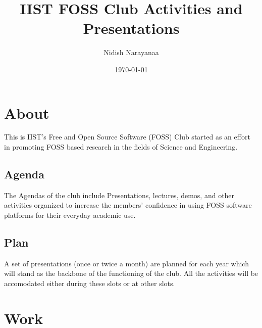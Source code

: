 \documentclass[11pt]{article}
\author{Nidish Narayanaa}
\date{\today}
\title{IIST FOSS Club Activities and Presentations}
\begin{document}
\maketitle
\tableofcontents


\section{About}
\label{sec-1}
  This is IIST's Free and Open Source Software (FOSS) Club started
as an effort in promoting FOSS based research in the fields of
Science and Engineering.
\subsection{Agenda}
\label{sec-1-1}
   The Agendas of the club include Presentations, lectures, demos, 
and other activities organized to increase the members' confidence
in using FOSS software platforms for their everyday academic use.
\subsection{Plan}
\label{sec-1-2}
   A set of presentations (once or twice a month) are planned for 
each year which will stand as the backbone of the functioning of 
the club. All the activities will be accomodated either during these
slots or at other slots.


\section{Work}
\label{sec-2}
\end{document}

